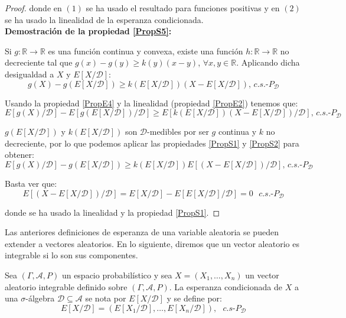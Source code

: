 \begin{proof}
donde en $(1)$ se ha usado el resultado para funciones positivas y en $(2)$ se ha usado la linealidad de la esperanza condicionada.\\

\textbf{Demostración de la propiedad \ref{PropS5}:}

Si $g:\mathds{R}\rightarrow \mathds{R}$ es una función continua y convexa, existe una función $h:\mathds{R}\rightarrow \mathds{R}$ no decreciente tal que $g(x)-g(y)\geq k(y)(x-y)$, $\forall x,y \in \mathds{R}$. Aplicando dicha desigualdad a $X$ y $E[X/\mathcal{D}]$:
$$ g(X)-g(E[X/\mathcal{D}])\geq k(E[X/\mathcal{D}])(X-E[X/\mathcal{D}])\text{, } c.s.\text{-}P_{\mathcal{D}}$$

Usando la propiedad \ref{PropE4} y la linealidad (propiedad \ref{PropE2}) tenemos que:
$$E[g(X)/\mathcal{D}]-E[g(E[X/\mathcal{D}])/\mathcal{D}]\geq E[k(E[X/\mathcal{D}])(X-E[X/\mathcal{D}])/\mathcal{D}]\text{, } c.s.\text{-}P_{\mathcal{D}}$$

$g(E[X/\mathcal{D}])$ y $k(E[X/\mathcal{D}])$ son $\mathcal{D}$-medibles por ser $g$ continua y $k$ no decreciente, por lo que podemos aplicar las propiedades \ref{PropS1} y \ref{PropS2} para obtener:
$$ E[g(X)/\mathcal{D}]-g(E[X/\mathcal{D}])\geq k(E[X/\mathcal{D}]) E[(X-E[X/\mathcal{D}])/\mathcal{D}]\text{, } c.s.\text{-}P_{\mathcal{D}} $$

Basta ver que:
$$E[(X-E[X/\mathcal{D}])/\mathcal{D}] = E[X/\mathcal{D}] - E[E[X/\mathcal{D}]/\mathcal{D}] = 0\text{ } c.s.\text{-}P_{\mathcal{D}}$$

donde se ha usado la linealidad y la propiedad \ref{PropS1}.

\end{proof}

Las anteriores definiciones de esperanza de una variable aleatoria se pueden extender a vectores aleatorios. En lo siguiente, diremos que un vector aleatorio es integrable si lo son sus componentes.

\begin{definicion}
Sea $(\Gamma, \mathcal{A}, P)$ un espacio probabilístico y sea $X = (X_1,\ldots ,X_n)$ un vector aleatorio integrable definido sobre $(\Gamma, \mathcal{A}, P)$. La esperanza condicionada de $X$ a una $\sigma$-álgebra $\mathcal{D}\subseteq \mathcal{A}$ se nota por $E[X/\mathcal{D}]$ y se define por:
$$E[X/\mathcal{D}] = (E[X_1/\mathcal{D}],\ldots ,E[X_n/\mathcal{D}]),\text{ }c.s\text{-}P_{\mathcal{D}} $$
\end{definicion}

